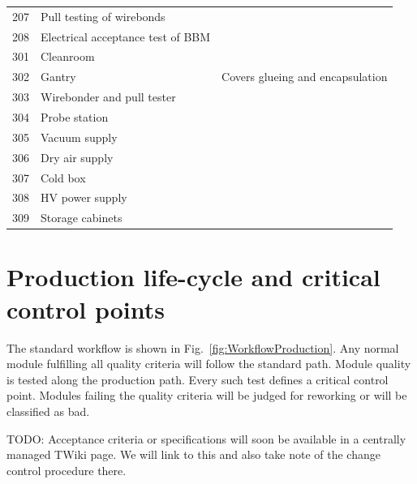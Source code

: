 \documentclass[12pt]{unlsilabsop}
\begin{document}
\begin{table}[hH]
\begin{center}
{\begin{tabular}{lp{7cm}p{6cm}}
207 & Pull testing of wirebonds & \\
208 & Electrical acceptance test of BBM & \\
\midrule
301 & Cleanroom & \\
302 & Gantry & Covers glueing and encapsulation \\
303 & Wirebonder and pull tester & \\
304 & Probe station & \\
305 & Vacuum supply & \\
306 & Dry air supply & \\
307 & Cold box & \\
308 & HV power supply & \\
309 & Storage cabinets & \\
\bottomrule
\end{tabular}
}
\end{center}
\end{table}

\section{Production life-cycle and critical control points}

The standard workflow is shown in Fig.~\ref{fig:WorkflowProduction}. Any normal module fulfilling all quality criteria will follow the standard path. Module quality is tested along the production path. Every such test defines a critical control point. Modules failing the quality criteria will be judged for reworking or will be classified as bad.

TODO: Acceptance criteria or specifications will soon be available in a centrally managed TWiki page. We will link to this and also take note of the change control procedure there.
\end{document}
